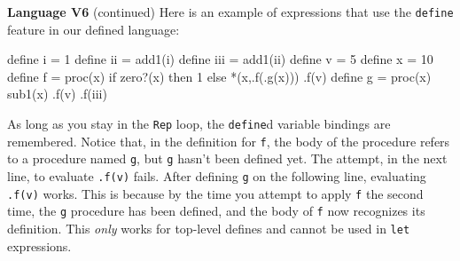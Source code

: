 \begin{minipage}[t]{\sw}
\slidenumber
\LARGE
{\bf Language V6} (continued)\exx
Here is an example of expressions
that use the \verb'define' feature
in our defined language:
\Large
\begin{qv}
define i = 1
define ii = add1(i)
define iii = add1(ii)
define v = 5
define x = 10
define f = proc(x) if zero?(x) then 1 else *(x,.f(.g(x)))
.f(v)   %
define g = proc(x) sub1(x)
.f(v)   %
.f(iii) %
\end{qv}
\LARGE
As long as you stay in the \verb'Rep' loop,
the \verb'define'd variable bindings are remembered.\exx
Notice that, in the definition for \verb'f',
the body of the procedure refers to a procedure named \verb'g',
but \verb'g' hasn't been defined yet.
The attempt, in the next line, to evaluate \verb'.f(v)' fails.
After defining \verb'g' on the following line,
evaluating \verb'.f(v)' works.
This is because
by the time you attempt to apply \verb'f' the second time,
the \verb'g' procedure has been defined,
and the body of \verb'f' now recognizes its definition.
This {\em only} works for top-level defines
and cannot be used in \verb'let' expressions.
\end{minipage}
